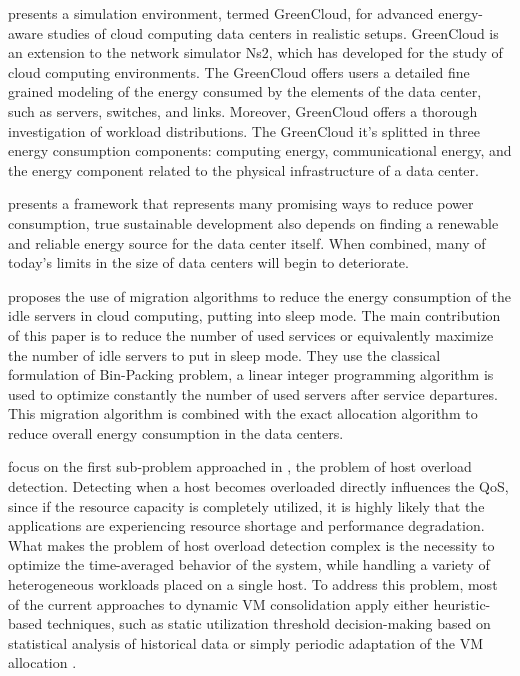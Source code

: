 \documentclass{article}
\begin{document}
\cite{Dzmitry} presents a simulation environment, termed
GreenCloud, for advanced energy-aware studies of cloud
computing data centers in realistic setups. GreenCloud is an extension to the network simulator Ns2, which has developed for the study of cloud computing environments. The GreenCloud offers users a detailed fine grained modeling of the energy consumed by the elements of the data center, such as servers, switches, and links. Moreover, GreenCloud offers a thorough investigation of workload distributions. The GreenCloud it's splitted in three energy consumption components: computing energy, communicational energy, and the energy component related to the physical infrastructure of a data center. 


\cite{Andrew} presents a framework that represents many promising ways to reduce power consumption, true sustainable development also depends on finding a renewable and reliable energy source for the data center itself. When combined, many of today's limits in the size of data centers will begin to deteriorate. 

\cite{Ghribi} proposes the use of migration algorithms to reduce the energy consumption of the idle servers in cloud computing, putting into sleep mode. The main contribution of this paper is to reduce the number of used services  or equivalently maximize the number of idle servers to put in sleep mode.  They use the classical formulation of Bin-Packing problem,  a linear integer programming algorithm is used to optimize constantly the number of used servers after
service departures. This migration algorithm is combined with the exact allocation algorithm to reduce overall energy consumption in the data centers. 

\cite{Beloglazov} focus on the first sub-problem approached in \cite{beloglazov2012optimal}, the problem  of  host  overload  detection. Detecting  when  a host  becomes  overloaded  directly  influences  the  QoS, since  if  the  resource  capacity  is  completely  utilized,  it is  highly  likely  that  the  applications  are  experiencing resource  shortage  and  performance  degradation.  What makes  the  problem  of  host  overload  detection  complex is the necessity to optimize the time-averaged behavior of the system, while handling a variety of heterogeneous workloads placed on a single host. To address this problem, most of the current approaches to dynamic VM consolidation  apply  either  heuristic-based  techniques,  such as  static  utilization  threshold decision-making based on statistical analysis of historical data or simply periodic adaptation of the VM allocation .
\end{document}
